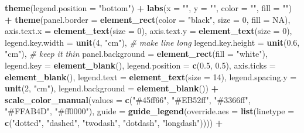 \documentclass[
]{article}
\newenvironment{Shaded}{\begin{snugshade}}{\end{snugshade}}
\newcommand{\AttributeTok}[1]{\textcolor[rgb]{0.13,0.29,0.53}{#1}}
\newcommand{\CommentTok}[1]{\textcolor[rgb]{0.56,0.35,0.01}{\textit{#1}}}
\newcommand{\ConstantTok}[1]{\textcolor[rgb]{0.56,0.35,0.01}{#1}}
\newcommand{\DecValTok}[1]{\textcolor[rgb]{0.00,0.00,0.81}{#1}}
\newcommand{\FloatTok}[1]{\textcolor[rgb]{0.00,0.00,0.81}{#1}}
\newcommand{\FunctionTok}[1]{\textcolor[rgb]{0.13,0.29,0.53}{\textbf{#1}}}
\newcommand{\NormalTok}[1]{#1}
\newcommand{\SpecialCharTok}[1]{\textcolor[rgb]{0.81,0.36,0.00}{\textbf{#1}}}
\newcommand{\StringTok}[1]{\textcolor[rgb]{0.31,0.60,0.02}{#1}}
\begin{document}
\begin{Shaded}
\begin{Highlighting}[]
  \FunctionTok{theme}\NormalTok{(}\AttributeTok{legend.position =} \StringTok{"bottom"}\NormalTok{) }\SpecialCharTok{+}
  \FunctionTok{labs}\NormalTok{(}\AttributeTok{x =} \StringTok{""}\NormalTok{, }\AttributeTok{y =} \StringTok{""}\NormalTok{, }\AttributeTok{color =} \StringTok{""}\NormalTok{, }\AttributeTok{fill =} \StringTok{""}\NormalTok{) }\SpecialCharTok{+}
  \FunctionTok{theme}\NormalTok{(}\AttributeTok{panel.border =} \FunctionTok{element\_rect}\NormalTok{(}\AttributeTok{color =} \StringTok{"black"}\NormalTok{, }\AttributeTok{size =} \DecValTok{0}\NormalTok{, }\AttributeTok{fill =} \ConstantTok{NA}\NormalTok{),}
        \AttributeTok{axis.text.x =} \FunctionTok{element\_text}\NormalTok{(}\AttributeTok{size =} \DecValTok{0}\NormalTok{),}
        \AttributeTok{axis.text.y =} \FunctionTok{element\_text}\NormalTok{(}\AttributeTok{size =} \DecValTok{0}\NormalTok{),}
        \AttributeTok{legend.key.width  =} \FunctionTok{unit}\NormalTok{(}\DecValTok{4}\NormalTok{, }\StringTok{"cm"}\NormalTok{),  }\CommentTok{\# make line long}
        \AttributeTok{legend.key.height =} \FunctionTok{unit}\NormalTok{(}\FloatTok{0.6}\NormalTok{, }\StringTok{"cm"}\NormalTok{), }\CommentTok{\# keep it thin}
        \AttributeTok{panel.background =} \FunctionTok{element\_rect}\NormalTok{(}\AttributeTok{fill =} \StringTok{"white"}\NormalTok{),}
        \AttributeTok{legend.key =} \FunctionTok{element\_blank}\NormalTok{(),}
        \AttributeTok{legend.position =} \FunctionTok{c}\NormalTok{(}\FloatTok{0.5}\NormalTok{, }\FloatTok{0.5}\NormalTok{),}
        \AttributeTok{axis.ticks =} \FunctionTok{element\_blank}\NormalTok{(),}
        \AttributeTok{legend.text  =} \FunctionTok{element\_text}\NormalTok{(}\AttributeTok{size =} \DecValTok{14}\NormalTok{),}
        \AttributeTok{legend.spacing.y =} \FunctionTok{unit}\NormalTok{(}\DecValTok{2}\NormalTok{, }\StringTok{"cm"}\NormalTok{),}
        \AttributeTok{legend.background =} \FunctionTok{element\_blank}\NormalTok{()) }\SpecialCharTok{+}
  \FunctionTok{scale\_color\_manual}\NormalTok{(}\AttributeTok{values =} \FunctionTok{c}\NormalTok{(}\StringTok{"\#45ff66"}\NormalTok{, }\StringTok{"\#EB52ff"}\NormalTok{, }\StringTok{"\#3366ff"}\NormalTok{, }\StringTok{"\#FFAB4D"}\NormalTok{, }\StringTok{"\#ff0000"}\NormalTok{),}
                     \AttributeTok{guide =} \FunctionTok{guide\_legend}\NormalTok{(}\AttributeTok{override.aes =} \FunctionTok{list}\NormalTok{(}\AttributeTok{linetype =} \FunctionTok{c}\NormalTok{(}\StringTok{"dotted"}\NormalTok{, }\StringTok{"dashed"}\NormalTok{, }\StringTok{"twodash"}\NormalTok{, }\StringTok{"dotdash"}\NormalTok{, }\StringTok{"longdash"}\NormalTok{)))) }\SpecialCharTok{+}

\end{Highlighting}
\end{Shaded}
\end{document}
